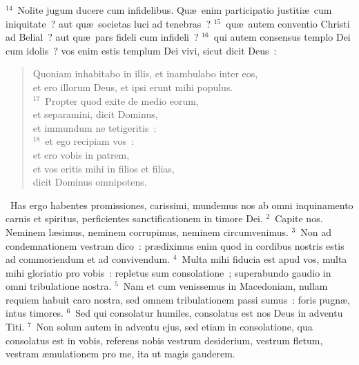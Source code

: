 ${}^{14}$~Nolite jugum ducere cum infidelibus. Qu\ae\ enim participatio justiti\ae\ cum iniquitate~? aut qu\ae\ societas luci ad tenebras~?
${}^{15}$~qu\ae\ autem conventio Christi ad Belial~? aut qu\ae\ pars fideli cum infideli~?
${}^{16}$~qui autem consensus templo Dei cum idolis~? vos enim estis templum Dei vivi, sicut dicit Deus~: \begin{flushleft}\begin{verse}Quoniam inhabitabo in illis, et inambulabo inter eos,\\ et ero illorum Deus, et ipsi erunt mihi populus.\\
${}^{17}$~Propter quod exite de medio eorum,\\ et separamini, dicit Dominus,\\ et immundum ne tetigeritis~:\\
${}^{18}$~et ego recipiam vos~:\\ et ero vobis in patrem,\\ et vos eritis mihi in filios et filias,\\ dicit Dominus omnipotens.\end{verse}\end{flushleft}


~Has ergo habentes promissiones, carissimi, mundemus nos ab omni inquinamento carnis et spiritus, perficientes sanctificationem in timore Dei.
${}^{2}$~Capite nos. Neminem l\ae simus, neminem corrupimus, neminem circumvenimus.
${}^{3}$~Non ad condemnationem vestram dico~: pr\ae diximus enim quod in cordibus nostris estis ad commoriendum et ad convivendum.
${}^{4}$~Multa mihi fiducia est apud vos, multa mihi gloriatio pro vobis~: repletus sum consolatione~; superabundo gaudio in omni tribulatione nostra.
${}^{5}$~Nam et cum venissemus in Macedoniam, nullam requiem habuit caro nostra, sed omnem tribulationem passi sumus~: foris pugn\ae , intus timores.
${}^{6}$~Sed qui consolatur humiles, consolatus est nos Deus in adventu Titi.
${}^{7}$~Non solum autem in adventu ejus, sed etiam in consolatione, qua consolatus est in vobis, referens nobis vestrum desiderium, vestrum fletum, vestram \ae mulationem pro me, ita ut magis gauderem.


